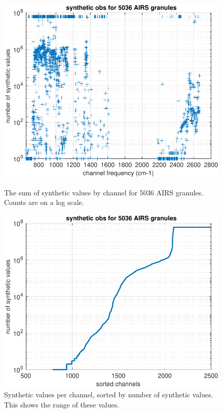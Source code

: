 \documentclass[12pt]{article}
\begin{document}
\begin{figure}
  \centering
  \begin{minipage}[t]{0.45\textwidth}
    \centering
    \includegraphics[width=\textwidth]{figures/synth_obs_freq_order.pdf}
    \caption{The sum of synthetic values by channel for 5036 AIRS
      granules.  Counts are on a log scale.}
    \label{fig8}
  \end{minipage}\hfill
  \begin{minipage}[t]{0.45\textwidth}
    \centering
    \includegraphics[width=\textwidth]{figures/synthetic_obs_counts.pdf}
    \caption{Synthetic values per channel, sorted by number of
      synthetic values.  This shows the range of these values.}
    \label{fig9}
  \end{minipage}
\end{figure}
\end{document}
